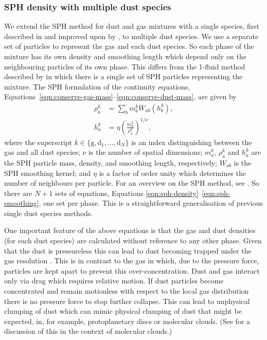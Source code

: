\documentclass[fleqn,usenatbib]{mnras}
\newcommand{\g}{\mathrm{g}}
\newcommand{\dd}{\mathrm{d}}
\begin{document}
\subsubsection{SPH density with multiple dust species}

We extend the SPH method for dust and gas mixtures with a single species, first
described in \citet{Monaghan1995CoPhC..87..225M} and improved upon by
\citet{Laibe2012MNRAS.420.2345L,Laibe2012MNRAS.420.2365L}, to multiple dust
species. We use a separate set of particles to represent the gas and each dust
species. So each phase of the mixture has its own density and smoothing length
which depend only on the neighbouring particles of its own phase. This differs
from the 1-fluid method described by \citet{Hutchison2018MNRAS.476.2186H} in
which there is a single set of SPH particles representing the mixture. The SPH
formulation of the continuity equations,
Equations~\ref{eqn:conserve-gas-mass}--\ref{eqn:conserve-dust-mass}, are given
by
%
\begin{align}
   \label{eqn:sph-density}
   \rho^k_a &= \sum_b m^k_b W_{ab}(h^k_b), \\
   h^k_a &= \eta \left(\frac{m^k_a}{\rho^k_a}\right)^{1/\nu},
   \label{eqn:sph-smoothing}
\end{align}
%
where the superscript \(k \in \{\g, \dd_1, \dots, \dd_N\}\) is an index
distinguishing between the gas and all dust species; \(\nu\) is the number of
spatial dimensions; \(m^k_a\), \(\rho^k_a\) and \(h^k_a\) are the SPH particle
mass, density, and smoothing length, respectively; \(W_{ab}\) is the SPH
smoothing kernel; and \(\eta\) is a factor of order unity which determines the
number of neighbours per particle. For an overview on the SPH method, see
\citet{Monaghan1992ARA&A..30..543M, Monaghan2005RPPh...68.1703M,
Price2012JCoPh.231..759P}. So there are \(N + 1\) sets of equations, Equations
\ref{eqn:sph-density}--\ref{eqn:sph-smoothing}, one set per phase. This is a
straightforward generalisation of previous single dust species methods.

One important feature of the above equations is that the gas and dust densities
(for each dust species) are calculated without reference to any other phase.
Given that the dust is pressureless this can lead to dust becoming trapped under
the gas resolution \citep{Laibe2012MNRAS.420.2345L}. This is in contrast to the
gas in which, due to the pressure force, particles are kept apart to prevent
this over-concentration. Dust and gas interact only via drag which requires
relative motion. If dust particles become concentrated and remain motionless
with respect to the local gas distribution there is no pressure force to stop
further collapse. This can lead to unphysical clumping of dust which can mimic
physical clumping of dust that might be expected, in, for example,
protoplanetary discs or molecular clouds. (See \citet{Tricco2017MNRAS.471L..52T}
for a discussion of this in the context of molecular clouds.)
\end{document}
